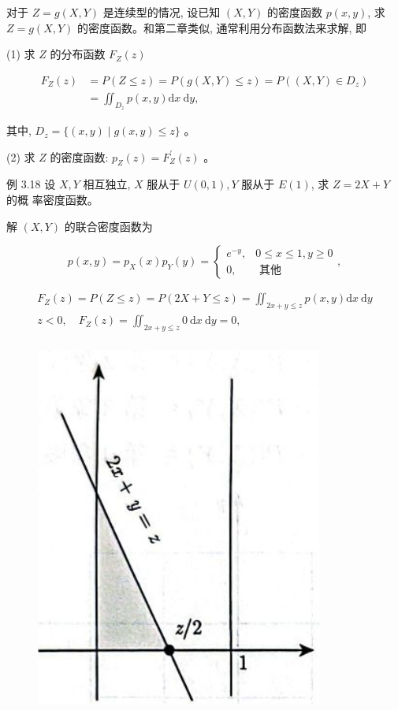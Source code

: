 \documentclass{beamer}
\begin{document}
	\begin{frame}
		对于 $Z=g(X, Y)$ 是连续型的情况, 设已知 $(X, Y)$ 的密度函数 $p(x, y)$, 求 $Z=g(X, Y)$ 的密度函数。和第二章类似, 通常利用分布函数法来求解, 即
		
		(1) 求 $Z$ 的分布函数 $F_{Z}(z)$
		
		\begin{align}
				F_{Z}(z) & = P(Z \leqslant z)=P(g(X, Y) \leqslant z)=P\left((X, Y) \in D_{z}\right)\\
				&=\iint_{D_{z}} p(x, y) \mathrm{d} x \mathrm{~d} y,
		\end{align}
		
		其中, $D_{z}=\{(x, y) \mid g(x, y) \leqslant z\}$ 。
		
		(2) 求 $Z$ 的密度函数: $p_{Z}(z)=F_{Z}^{\prime}(z)$ 。
	\end{frame}
	\begin{frame}
		例 3.18 设 $X, Y$ 相互独立, $X$ 服从于 $U(0,1), Y$ 服从于 $E(1)$, 求 $Z=2 X+Y$ 的概 率密度函数。
	\end{frame}
	
	\begin{frame}
		解 $(X, Y)$ 的联合密度函数为
		
		$$
		p(x, y)=p_{X}(x) p_{Y}(y)=\left\{\begin{array}{cc}
			e^{-y}, & 0 \leqslant x \leqslant 1, y \geqslant 0 \\
			0, & \text { 其他 }
		\end{array},\right.
		$$
		
		$$
		\begin{gathered}
			F_{Z}(z)=P(Z \leqslant z)=P(2 X+Y \leqslant z)=\iint_{2 x+y \leqslant z} p(x, y) \mathrm{d} x \mathrm{~d} y \\
			z<0, \quad F_{Z}(z)=\iint_{2 x+y \leqslant z} 0 \mathrm{~d} x \mathrm{~d} y=0, \\
		\end{gathered}
		$$
		\begin{figure}
			\centering
			\includegraphics[scale = 0.2]{figures/figure3-53.png}
		\end{figure}
	\end{frame}
	
\end{document}
